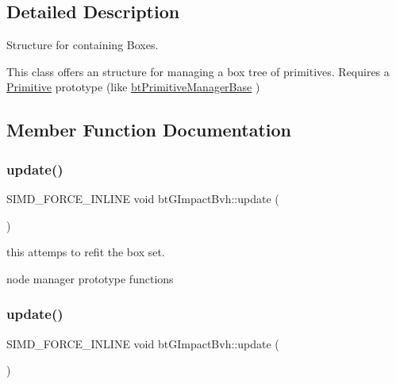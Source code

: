 \subsection{Detailed Description}
Structure for containing Boxes. 

This class offers an structure for managing a box tree of primitives. Requires a \hyperlink{classPrimitive}{Primitive} prototype (like \hyperlink{classbtPrimitiveManagerBase}{bt\+Primitive\+Manager\+Base} ) 

\subsection{Member Function Documentation}
\mbox{\label{classbtGImpactBvh_ac0511b84c8722348fe4295b2a8f40c81}} 
\subsubsection{\texorpdfstring{update()}{update()}\hspace{0.1cm}{\footnotesize\ttfamily [1/2]}}
{\footnotesize\ttfamily S\+I\+M\+D\+\_\+\+F\+O\+R\+C\+E\+\_\+\+I\+N\+L\+I\+NE void bt\+G\+Impact\+Bvh\+::update (\begin{DoxyParamCaption}{ }\end{DoxyParamCaption})\hspace{0.3cm}{\ttfamily [inline]}}



this attemps to refit the box set. 

node manager prototype functions \mbox{\label{classbtGImpactBvh_ac0511b84c8722348fe4295b2a8f40c81}} 
\subsubsection{\texorpdfstring{update()}{update()}\hspace{0.1cm}{\footnotesize\ttfamily [2/2]}}
{\footnotesize\ttfamily S\+I\+M\+D\+\_\+\+F\+O\+R\+C\+E\+\_\+\+I\+N\+L\+I\+NE void bt\+G\+Impact\+Bvh\+::update (\begin{DoxyParamCaption}{ }\end{DoxyParamCaption})\hspace{0.3cm}{\ttfamily [inline]}}



